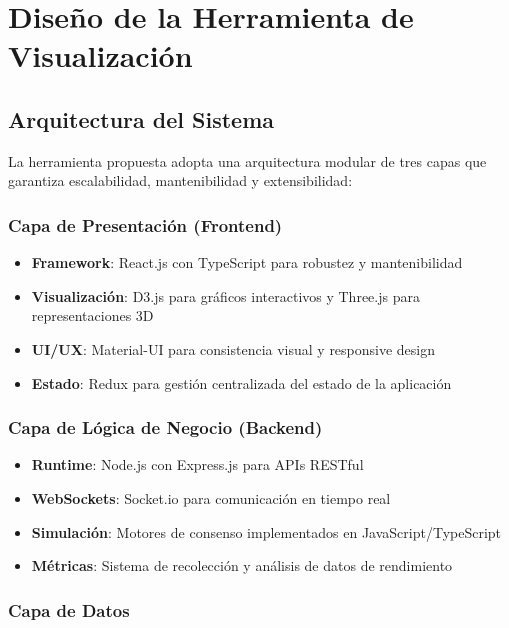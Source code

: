\section{Diseño de la Herramienta de Visualización}

\subsection{Arquitectura del Sistema}

La herramienta propuesta adopta una arquitectura modular de tres capas que garantiza escalabilidad, mantenibilidad y extensibilidad:

\subsubsection{Capa de Presentación (Frontend)}

\begin{itemize}
    \item \textbf{Framework}: React.js con TypeScript para robustez y mantenibilidad
    \item \textbf{Visualización}: D3.js para gráficos interactivos y Three.js para representaciones 3D
    \item \textbf{UI/UX}: Material-UI para consistencia visual y responsive design
    \item \textbf{Estado}: Redux para gestión centralizada del estado de la aplicación
\end{itemize}

\subsubsection{Capa de Lógica de Negocio (Backend)}

\begin{itemize}
    \item \textbf{Runtime}: Node.js con Express.js para APIs RESTful
    \item \textbf{WebSockets}: Socket.io para comunicación en tiempo real
    \item \textbf{Simulación}: Motores de consenso implementados en JavaScript/TypeScript
    \item \textbf{Métricas}: Sistema de recolección y análisis de datos de rendimiento
\end{itemize}

\subsubsection{Capa de Datos}

